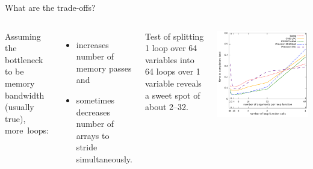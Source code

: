 \documentclass{beamer}
\begin{document}
\begin{frame}{What are the trade-offs?}
\vspace{0.5 cm}
\begin{columns}
Assuming the bottleneck to be memory bandwidth (usually true), \mbox{more loops:\hspace{-1 cm}}
\begin{itemize}
\item increases number of memory passes and
\item sometimes decreases number of arrays to stride simultaneously.
\end{itemize}

\vspace{0.5 cm}
Test of splitting 1 loop over 64 variables into 64 loops over 1 variable reveals a sweet spot of about 2--32.

\includegraphics[width=\linewidth]{time_vs_num_arguments.pdf}
\end{columns}
\end{frame}
\end{document}
